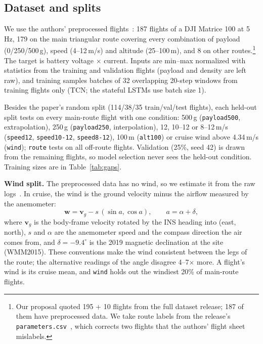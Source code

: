 \documentclass{article}
\begin{document}
\subsection{Dataset and splits}
We use the authors' preprocessed flights~\cite{cvarcode}: 187 flights of a DJI Matrice 100 at 5\,Hz, 179 on the
main triangular route covering every combination of payload (0/250/500\,g), speed (4--12\,m/s) and altitude
(25--100\,m), and 8 on other routes.\footnote{Our proposal quoted 195 + 10 flights from the full dataset
release; 187 of them have preprocessed data. We take route labels from the release's
\texttt{parameters.csv}~\cite{rodrigues2021}, which corrects two flights that the authors' flight sheet mislabels.}
The target is battery voltage $\times$ current. Inputs are min--max normalized with statistics from the training
and validation flights (payload and density are left raw), and training samples batches of 32 overlapping 20-step
windows from training flights only (TCN; the stateful LSTMs use batch size 1).

Besides the paper's random split (114/38/35 train/val/test flights), each held-out split tests on every
main-route flight with one condition: 500\,g (\texttt{payload500}, extrapolation), 250\,g (\texttt{payload250},
interpolation), 12, 10--12 or 8--12\,m/s (\texttt{speed12}, \texttt{speed10-12}, \texttt{speed8-12}), 100\,m
(\texttt{alt100}) or cruise wind above 4.34\,m/s (\texttt{wind}); \texttt{route} tests on all off-route flights.
Validation (25\%, seed 42) is drawn from the remaining flights, so model selection never sees the held-out
condition. Training sizes are in Table~\ref{tab:gaps}.

\textbf{Wind split.} The preprocessed data has no wind, so we estimate it from the raw logs~\cite{rodrigues2021}.
In cruise, the wind is the ground velocity minus the airflow measured by the anemometer:
\begin{equation}
  \mathbf{w} = \mathbf{v}_g - s\,(\sin a, \cos a), \qquad a = \alpha + \delta ,
\end{equation}
where $\mathbf{v}_g$ is the body-frame velocity rotated by the INS heading into (east, north), $s$ and $\alpha$
are the anemometer speed and the compass direction the air comes from, and $\delta=-9.4^\circ$ is the 2019
magnetic declination at the site (WMM2015). These conventions make the wind consistent between the legs of the
route; the alternative readings of the angle disagree 4--7$\times$ more. A flight's wind is its cruise mean, and
\texttt{wind} holds out the windiest 20\% of main-route flights.
\end{document}
